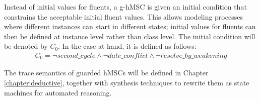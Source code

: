 \begin{description}
Instead of initial values for fluents, a g-hMSC is given an initial condition that constrains the acceptable initial fluent values. This allows modeling processes where different instances can start in different states; initial values for fluents can then be defined at instance level rather than class level. The initial condition will be denoted by $C_0$. In the case at hand, it is defined as follows:
\begin{align*}
C_0 = \neg second\_cycle \wedge \neg date\_conflict \wedge \neg resolve\_by\_weakening
\end{align*}

\end{description} 

The trace semantics of guarded hMSCs will be defined in Chapter \ref{chapter:deductive}, together with synthesis techniques to rewrite them as state machines for automated reasoning.
